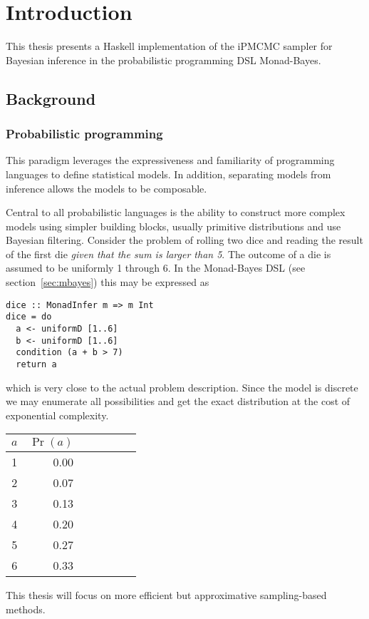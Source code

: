 \section{Introduction}

This thesis presents a Haskell implementation of the iPMCMC sampler for Bayesian inference in the probabilistic programming DSL Monad-Bayes.

\subsection{Background}

\subsubsection{Probabilistic programming}
\label{sec:pprog}

This paradigm leverages the expressiveness and familiarity of programming
languages  to define statistical models. In addition, separating models from inference allows the models to be composable.

Central to all probabilistic languages is the ability to construct more
complex models using simpler building blocks, usually primitive distributions
and use Bayesian filtering. Consider the problem of rolling two dice and reading the result of
the first die \emph{given that the sum is larger than 5}. The outcome of a die is
assumed to be uniformly 1 through 6.
In the Monad-Bayes DSL (see section~\ref{sec:mbayes}) this may be
expressed as
\begin{verbatim}
dice :: MonadInfer m => m Int
dice = do
  a <- uniformD [1..6]
  b <- uniformD [1..6]
  condition (a + b > 7)
  return a
\end{verbatim}
which is very close to the actual problem description. Since the model is
discrete we may enumerate all possibilities and get the exact distribution at
the cost of exponential complexity.

\begin{center}
  
  \begin{tabular}{crrrrrr}
    \toprule
    \midrule
    $a$ & $\Pr(a)$ \\
    \midrule
    1&0.00 \\
2&0.07 \\
3&0.13\\
4&0.20 \\
5&0.27\\
6&0.33\\
\midrule
\bottomrule
  \end{tabular}
\end{center}
This thesis will focus on more efficient but approximative sampling-based
methods.

